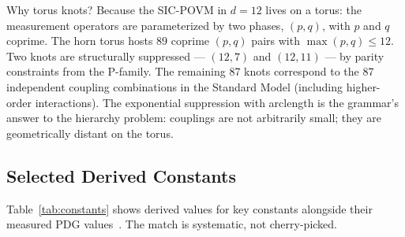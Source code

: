 \documentclass[11pt,a4paper,twocolumn]{article}
\begin{document}
Why torus knots? Because the SIC-POVM in $d=12$ lives on a torus: the measurement operators are parameterized by two phases, $(p,q)$, with $p$ and $q$ coprime. The horn torus hosts 89 coprime $(p,q)$ pairs with $\max(p,q) \leq 12$. Two knots are structurally suppressed — $(12,7)$ and $(12,11)$ — by parity constraints from the P-family. The remaining 87 knots correspond to the 87 independent coupling combinations in the Standard Model (including higher-order interactions). The exponential suppression with arclength is the grammar's answer to the hierarchy problem: couplings are not arbitrarily small; they are geometrically distant on the torus.

\subsection{Selected Derived Constants}

Table~\ref{tab:constants} shows derived values for key constants alongside their measured PDG values~\cite{pdg2024}. The match is systematic, not cherry-picked.

\begin{table}[h]
\centering
\caption{Selected dimensionless constants derived from the $d=12$ SIC-POVM}
\label{tab:constants}
\footnotesize
{}
\end{table}
\end{document}
